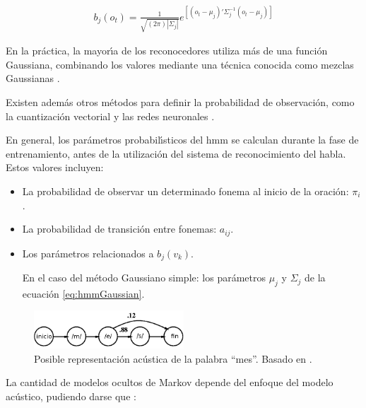 \begin{enumerate}[A)]
	\begin{align}
    	b_j(o_t) = \frac{1}{\sqrt{(2\pi)|\Sigma_j|}}e^{[(o_t-\mu_j)'\Sigma_j^{-1}(o_t-\mu_j)]}\label{eq:hmmGaussian}
	\end{align}

	En la pr\'actica, la mayor{\'\i}a de los reconocedores utiliza m\'as de una funci\'on Gaussiana, combinando
	los valores mediante una t\'ecnica conocida como mezclas Gaussianas \cite{huang-handbook10}.

	Existen adem\'as otros m\'etodos para definir la probabilidad de observaci\'on, como la cuantizaci\'on
	vectorial \cite{Burton1983} y las redes neuronales \cite{KristineApplying1995}.

	En general, los par\'ametros probabil{\'\i}sticos del \gls{hmm} se calculan durante la fase de entrenamiento,
	antes de la utilizaci\'on del sistema de reconocimiento del habla. Estos valores incluyen:

	\begin{itemize}
		\item La probabilidad de observar un determinado fonema al inicio de la oraci\'on: $\pi_i$.
		\item La probabilidad de transici\'on entre fonemas: $a_{ij}$.
		\item Los par\'ametros relacionados a $b_j(v_k)$. 

		En el caso del m\'etodo Gaussiano simple: los par\'ametros $\mu_j$ y $\Sigma_j$ de la 
		ecuaci\'on \ref{eq:hmmGaussian}.
	\end{itemize}

\end{enumerate}

\begin{figure}[H] 
\centering
\includegraphics[width=0.5\textwidth]{./graphics/hmm_palabra.png}
\caption{Posible representaci\'on ac\'ustica de la palabra ``mes''. Basado en \cite{Jurafsky}.}
\label{figure:hmm-palabra}
\end{figure}

La cantidad de modelos ocultos de Markov depende del enfoque del modelo ac\'ustico, pudiendo darse 
que \cite{Livescu2012}:

